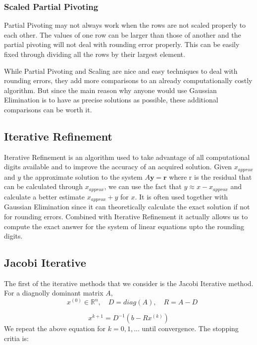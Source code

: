 \documentclass[11pt]{article}	%
\begin{document}
    \subsubsection{Scaled Partial Pivoting}
    Partial Pivoting may not always work when the rows are not scaled properly to each other. The values of one row can be larger than those of another and the partial pivoting will not deal with rounding error properly. This can be easily fixed through dividing all the rows by their largest element.

   	While Partial Pivoting and Scaling are nice and easy techniques to deal with rounding errors, they add more comparisons to an already computationally costly algorithm. But since the main reason why anyone would use Gaussian Elimination is to have as precise solutions as possible, these additional comparisons can be worth it.

\subsection{Iterative Refinement}

Iterative Refinement is an algorithm used to take advantage of all computational digits available and to improve the accuracy of an acquired solution. Given $x_{approx}$ and $y$ the approximate solution to the system $A\textbf{y} = \textbf{r}$ where r is the residual that can be calculated through $x_{approx}$, we can use the fact that $y \approx x - x_{approx}$ and calculate a better estimate $x_{approx} + y$ for $x$. It is often used together with Gaussian Elimination since it can theoretically calculate the exact solution if not for rounding errors. Combined with Iterative Refinement it actually allows us to compute the exact answer for the system of linear equations upto the rounding digits.


\subsection{Jacobi Iterative}
    The first of the iterative methods that we consider is the Jacobi Iterative method. For a diagnolly dominant matrix $A$,
    \begin{equation}\label{eq:jacobi-eq-1-qualifier}
        \quad x^{(0)}\in {\mathbb R}^n,\quad D = diag(A),\quad R = A - D
    \end{equation}

    \begin{equation}\label{eq:jacobi-eq-1}
        x^{k+1} = D^{-1}(b- Rx^{(k)})
    \end{equation}
    We repeat the above equation for $k = 0, 1, ...$ until convergence. The stopping critia is:
\end{document}
